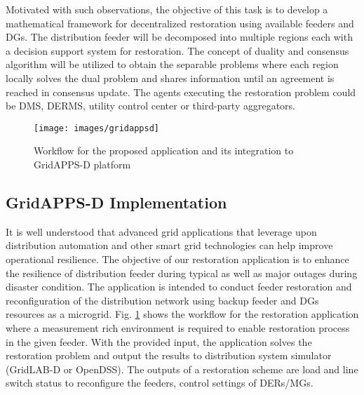\documentclass[12pt]{article}
\begin{document}
\begin{enumerate}
    
    \hspace{0.5 cm}Motivated with such observations, the objective of this task is to develop a mathematical framework for decentralized restoration using available feeders and DGs. The distribution feeder will be decomposed into multiple regions each with a decision support system for restoration. The concept of duality and consensus algorithm will be utilized to obtain the separable problems where each region locally solves the dual problem and shares information until an agreement is reached in consensus update. The agents executing the restoration problem could be DMS, DERMS, utility control center or third-party aggregators. 
\end{enumerate}



\begin{figure}[h] 
\centering
    \texttt{[image: images/gridappsd]}
  \vspace{-0.5 cm}
  \caption{\small Workflow for the proposed application and its integration to GridAPPS-D platform}
\label{fig:grid}
\end{figure}
\vspace{-0.9 cm}
\subsection{GridAPPS-D Implementation}
 It is well understood that advanced grid applications that leverage upon distribution automation and other smart grid technologies can help improve operational resilience. The objective of our restoration application is to enhance the resilience of distribution feeder during typical as well as major outages during disaster condition. The application is intended to conduct feeder restoration and reconfiguration of the distribution network using backup feeder and DGs resources as a microgrid. Fig. \ref{fig:grid} shows the workflow for the restoration application where a measurement rich environment is required to enable restoration process in the given feeder. With the provided input, the application solves the restoration problem and output the results to distribution system simulator (GridLAB-D or OpenDSS). The outputs of a restoration scheme are load and line switch status to reconfigure the feeders, control settings of DERs/MGs.
\end{document}

